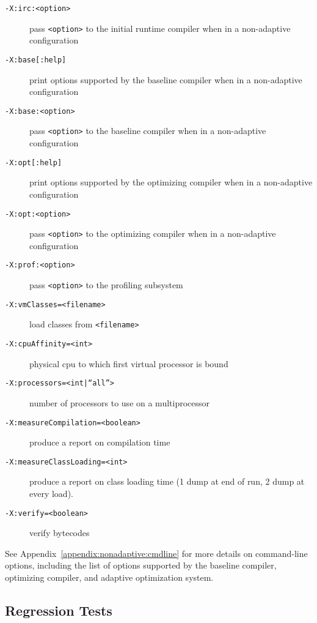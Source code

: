 \begin{description}
\item[{\tt -X:irc:<option>}]
pass {\tt <option>} to the initial runtime compiler when in a non-adaptive configuration 

\item[{\tt -X:base[:help]}]
print options supported by the baseline compiler when in a 
non-adaptive configuration

\item[{\tt -X:base:<option>}]
pass {\tt <option>} to the baseline compiler when in a non-adaptive configuration

\item[{\tt -X:opt[:help]}]
print options supported by the optimizing compiler when in a 
non-adaptive configuration

\item[{\tt -X:opt:<option>}]
pass {\tt <option>} to the optimizing compiler when in a non-adaptive configuration

\item[{\tt -X:prof:<option>}]
pass {\tt <option>} to the profiling subsystem

\item[{\tt -X:vmClasses=<filename>}]
load classes from {\tt <filename>}

\item[{\tt -X:cpuAffinity=<int>}]
physical cpu to which first virtual processor is bound

\item[{\tt -X:processors=<int|``all''>}]
number of processors to use on a multiprocessor

\item[{\tt -X:measureCompilation=<boolean>}]
produce a report on compilation time

\item[{\tt -X:measureClassLoading=<int>}]
produce a report on class loading time (1 dump at end of run, 2 dump
at every load).

\item[{\tt -X:verify=<boolean>}] verify bytecodes
\end{description}

See Appendix~\ref{appendix:nonadaptive:cmdline} for more details on 
command-line options, including the list of options supported by the 
baseline compiler, optimizing compiler, and adaptive optimization system.

\JikesTMFooter

\JavaTMFooter

\subsection{Regression Tests}

